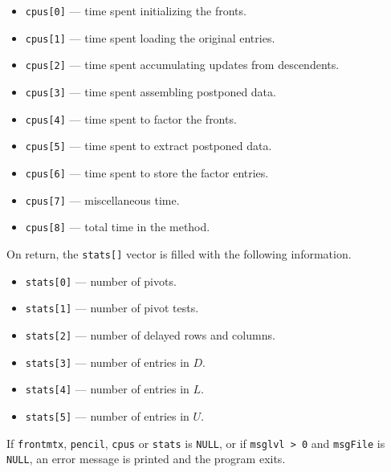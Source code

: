 \begin{enumerate}
\begin{itemize}
\item
{\tt cpus[0]} --- time spent initializing the fronts.
\item
{\tt cpus[1]} --- time spent loading the original entries.
\item
{\tt cpus[2]} --- time spent accumulating updates from descendents.
\item
{\tt cpus[3]} --- time spent assembling postponed data.
\item
{\tt cpus[4]} --- time spent to factor the fronts.
\item
{\tt cpus[5]} --- time spent to extract postponed data.
\item
{\tt cpus[6]} --- time spent to store the factor entries.
\item
{\tt cpus[7]} --- miscellaneous time.
\item
{\tt cpus[8]} --- total time in the method.
\end{itemize}
On return, the {\tt stats[]} vector is filled with the following
information.
\begin{itemize}
\item
{\tt stats[0]} --- number of pivots.
\item
{\tt stats[1]} --- number of pivot tests.
\item
{\tt stats[2]} --- number of delayed rows and columns.
\item
{\tt stats[3]} --- number of entries in $D$.
\item
{\tt stats[4]} --- number of entries in $L$.
\item
{\tt stats[5]} --- number of entries in $U$.
\end{itemize}
\par {}
If {\tt frontmtx}, {\tt pencil}, {\tt cpus} or {\tt stats} 
is {\tt NULL},
or if {\tt msglvl > 0} and {\tt msgFile} is {\tt NULL},
an error message is printed and the program exits.
\end{enumerate}
\par
